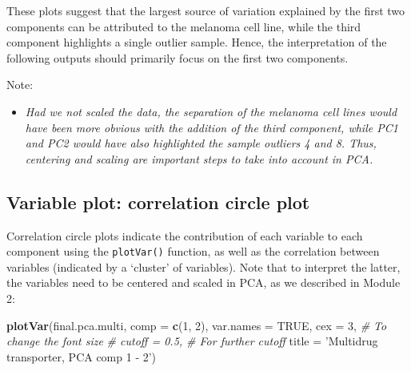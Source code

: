 \documentclass[]{book}
\newenvironment{Shaded}{\begin{snugshade}}{\end{snugshade}}
\newcommand{\KeywordTok}[1]{\textcolor[rgb]{0.13,0.29,0.53}{\textbf{#1}}}
\newcommand{\DataTypeTok}[1]{\textcolor[rgb]{0.13,0.29,0.53}{#1}}
\newcommand{\DecValTok}[1]{\textcolor[rgb]{0.00,0.00,0.81}{#1}}
\newcommand{\StringTok}[1]{\textcolor[rgb]{0.31,0.60,0.02}{#1}}
\newcommand{\CommentTok}[1]{\textcolor[rgb]{0.56,0.35,0.01}{\textit{#1}}}
\newcommand{\OtherTok}[1]{\textcolor[rgb]{0.56,0.35,0.01}{#1}}
\newcommand{\OperatorTok}[1]{\textcolor[rgb]{0.81,0.36,0.00}{\textbf{#1}}}
\newcommand{\NormalTok}[1]{#1}
\providecommand{\tightlist}{%
  \setlength{\itemsep}{0pt}\setlength{\parskip}{0pt}}
\begin{document}
\begin{Shaded}
\end{Shaded}

These plots suggest that the largest source of variation explained by
the first two components can be attributed to the melanoma cell line,
while the third component highlights a single outlier sample. Hence, the
interpretation of the following outputs should primarily focus on the
first two components.

Note:

\begin{itemize}
\tightlist
\item
  \emph{Had we not scaled the data, the separation of the melanoma cell
  lines would have been more obvious with the addition of the third
  component, while PC1 and PC2 would have also highlighted the sample
  outliers 4 and 8. Thus, centering and scaling are important steps to
  take into account in PCA.}
\end{itemize}

\subsection{Variable plot: correlation circle
plot}\label{variable-plot-correlation-circle-plot}

Correlation circle plots indicate the contribution of each variable to
each component using the \texttt{plotVar()} function, as well as the
correlation between variables (indicated by a `cluster' of variables).
Note that to interpret the latter, the variables need to be centered and
scaled in PCA, as we described in Module 2:

\begin{Shaded}
\begin{Highlighting}[]
\KeywordTok{plotVar}\NormalTok{(final.pca.multi, }\DataTypeTok{comp =} \KeywordTok{c}\NormalTok{(}\DecValTok{1}\NormalTok{, }\DecValTok{2}\NormalTok{),}
        \DataTypeTok{var.names =} \OtherTok{TRUE}\NormalTok{,}
        \DataTypeTok{cex =} \DecValTok{3}\NormalTok{,         }\CommentTok{# To change the font size}
        \CommentTok{# cutoff = 0.5,  # For further cutoff}
        \DataTypeTok{title =} \StringTok{'Multidrug transporter, PCA comp 1 - 2'}\NormalTok{)}
\end{Highlighting}
\end{Shaded}
\end{document}
